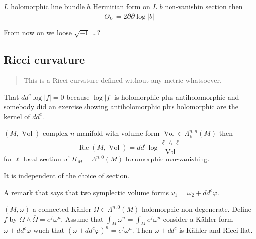 \begin{coro}\leavevmode
	$L$ holomorphic line bundle $h $ Hermitian form on $L$ $b$ non-vanishin section then
	\[\Theta_\nabla=2\partial \bar\partial \operatorname{log}|b|\]
	\begin{remark}\leavevmode
		From now on we loose $\sqrt{-1}$ …?
	\end{remark}
\end{coro}

\subsection{Ricci curvature}

{\color{3}\begin{quotation}
	This is a Ricci curvature defined without any metric whatsoever.
\end{quotation}}

\begin{claim}\leavevmode
	That $d d^c \operatorname{log}|f|=0$ because $\operatorname{log}|f|$ is holomorphic plus antiholomorphic and somebody did an exercise showing antiholomorphic plus holomorphic are the kernel of $d d^c$.
\end{claim}

\begin{defn}\leavevmode
	$(M,\operatorname{Vol})$ complex $n$ manifold with volume form $\operatorname{Vol}\in \Lambda^{n,n}_{\mathbb{R}}(M)$ then
	\[\operatorname{Ric}(M,\operatorname{Vol})= dd^c \operatorname{log}\frac{\ell\wedge \bar{\ell} }{\operatorname{Vol}}\]
	for $\ell$ local section of $K_M=\Lambda^{n,0}(M)$ holomorphic non-vanishing.
\end{defn}

\begin{remark}\leavevmode
	It is independent of the choice of section.
\end{remark}

\begin{remark}\leavevmode
	A remark that says that two symplectic volume forms $\omega_1=\omega_2 +d d^c \varphi$.
\end{remark}

\begin{coro}\leavevmode
	 $(M,\omega)$ a connected Kähler $\Omega\in \Lambda^{n,0}(M)$ holomorphic non-degenerate. Define $f $ by $\Omega\wedge \overline{\Omega}=e^f \omega^n$. Assume that $\int_{M}\omega^n=\int_{M}e^f \omega^n$ consider a Kähler form $\omega+d d^c \varphi$ wuch that $(\omega+ d d^c \varphi)^n=e^f \omega^n$. Then $\omega+d d^c$ is Kähler and Ricci-flat.
\end{coro}

